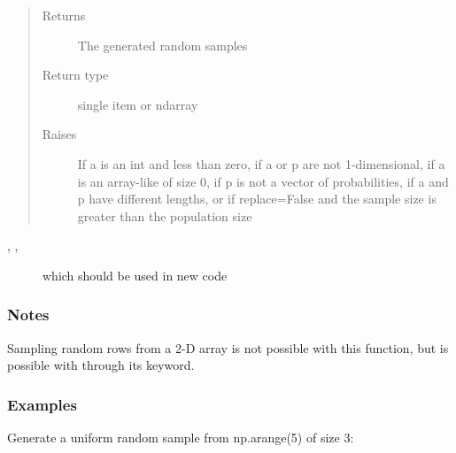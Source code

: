 \documentclass[letterpaper,10pt,english]{sphinxmanual}
\begin{document}
\begin{fulllineitems}
\begin{quote}
\begin{description}
\begin{itemize}
\end{itemize}

\item[{Returns}] \leavevmode
{} \textendash{} The generated random samples

\item[{Return type}] \leavevmode
single item or ndarray

\item[{Raises}] \leavevmode
{} \textendash{} If a is an int and less than zero, if a or p are not 1-dimensional,
if a is an array-like of size 0, if p is not a vector of
probabilities, if a and p have different lengths, or if
replace=False and the sample size is greater than the population
size

\end{description}\end{quote}




, , 
\begin{description}
\item[{}] \leavevmode
which should be used in new code

\end{description}


\subsubsection*{Notes}

Sampling random rows from a 2-D array is not possible with this function,
but is possible with  through its  keyword.
\subsubsection*{Examples}

Generate a uniform random sample from np.arange(5) of size 3:

\begin{sphinxVerbatim}[commandchars=\\\{\}]
 
\end{sphinxVerbatim}


\end{fulllineitems}
\end{document}
